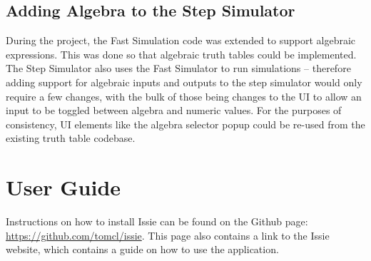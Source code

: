 \subsection{Adding Algebra to the Step Simulator}
During the project, the Fast Simulation code was extended to support algebraic expressions. This was done so that algebraic truth tables could be implemented. The Step Simulator also uses the Fast Simulator to run simulations -- therefore adding support for algebraic inputs and outputs to the step simulator would only require a few changes, with the bulk of those being changes to the UI to allow an input to be toggled between algebra and numeric values. For the purposes of consistency, UI elements like the algebra selector popup could be re-used from the existing truth table codebase.

\section{User Guide}
Instructions on how to install Issie can be found on the Github page: \url{https://github.com/tomcl/issie}. This page also contains a link to the Issie website, which contains a guide on how to use the application.
